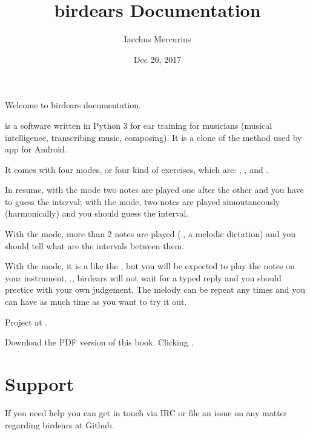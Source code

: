 \documentclass[letterpaper,10pt,english]{sphinxmanual}
\title{birdears Documentation}
\date{Dec 20, 2017}
\author{Iacchus Mercurius}
\begin{document}
\maketitle
\sphinxtableofcontents
{}\label{\detokenize{index::doc}}


Welcome to birdears documentation.

 is a software written in Python 3 for ear training for
musicians (musical intelligence, transcribing music, composing). It is a
clone of the method used by 
app for Android.

It comes with four modes, or four kind of exercises, which are:
, ,  and .

In resume, with the  mode two notes are played one after the
other and you have to guess the interval; with the  mode,
two notes are played simoutaneously (harmonically) and you should guess
the interval.

With the  mode, more than 2 notes are played (., a
melodic dictation) and you should tell what are the intervals between
them.

With the  mode, it is a like the , but you will
be expected to play the notes on your instrument, ., birdears will
not wait for a typed reply and you should prectice with your own
judgement. The melody can be repeat any times and you can have as much
time as you want to try it out.

Project at .

Download the PDF version of this book. Clicking .




\chapter{Support}
\label{\detokenize{community:birdears-documentation}}\label{\detokenize{community:support}}\label{\detokenize{community::doc}}
If you need help you can get in touch via IRC or file an issue on any matter regarding birdears at Github.
\end{document}
